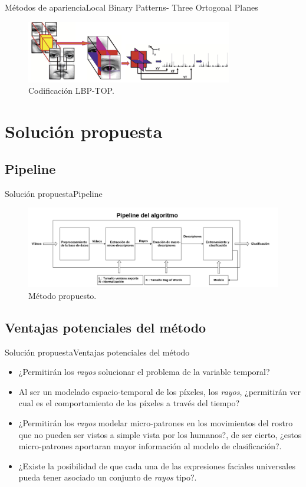 \documentclass{beamer}
\begin{document}
        
        \begin{frame}{Métodos de apariencia}{Local Binary Patterns- Three Ortogonal Planes}
            \begin{figure}[bt]
        		\centering
                \includegraphics[width=9cm]{imagenes/lbptop.pdf}
          		\caption{Codificación LBP-TOP.}
            \end{figure}
        \end{frame}
    

\section{Solución propuesta}
	\subsection{Pipeline}    
    \begin{frame}{Solución propuesta}{Pipeline}
        \begin{figure}[bt]
    		\centering
            \includegraphics[width=12cm]{imagenes/pipeline.png}
      		\caption{Método propuesto.}
        \end{figure}
    \end{frame}

	\subsection{Ventajas potenciales del método}
		\begin{frame}{Solución propuesta}{Ventajas potenciales del método}
			\begin{itemize}
				\item ¿Permitirán los \textit{rayos} solucionar el problema de la variable temporal?
				\item Al ser un modelado espacio-temporal de los píxeles, los \textit{rayos}, ¿permitirán ver cual es el comportamiento de los píxeles a través del tiempo?
				\item ¿Permitirán los \textit{rayos} modelar micro-patrones en los movimientos del rostro que no pueden ser vistos a simple vista por los humanos?, de ser cierto, ¿estos micro-patrones aportaran mayor información al modelo de clasificación?.
				\item ¿Existe la posibilidad de que cada una de las expresiones faciales universales pueda tener asociado un conjunto de \textit{rayos} tipo?. 
			\end{itemize}
		\end{frame}	
	
\end{document}
